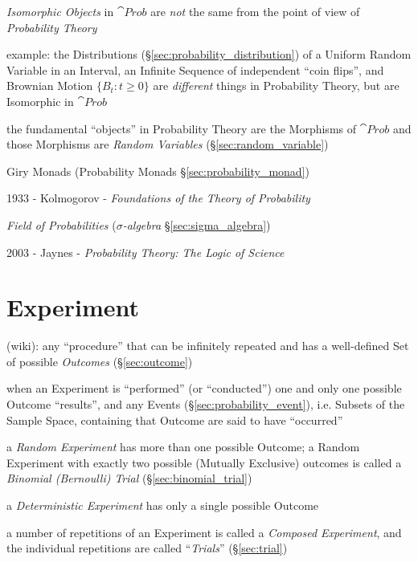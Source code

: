 \emph{Isomorphic Objects} in $\cat{Prob}$ are \emph{not} the same from the point
of view of \emph{Probability Theory}

example: the Distributions (\S\ref{sec:probability_distribution}) of a Uniform
Random Variable in an Interval, an Infinite Sequence of independent ``coin
flips'', and Brownian Motion $\{B_t : t \geq 0\}$ are \emph{different} things in
Probability Theory, but are Isomorphic in $\cat{Prob}$

the fundamental ``objects'' in Probability Theory are the Morphisms of
$\cat{Prob}$ and those Morphisms are \emph{Random Variables}
(\S\ref{sec:random_variable})

\fist Giry Monads (Probability Monads \S\ref{sec:probability_monad})

\asterism

1933 - Kolmogorov - \emph{Foundations of the Theory of Probability}

\emph{Field of Probabilities} (\emph{$\sigma$-algebra}
\S\ref{sec:sigma_algebra})

\asterism

2003 - Jaynes - \emph{Probability Theory: The Logic of Science}



\section{Experiment}\label{sec:experiment}

(wiki): any ``procedure'' that can be infinitely repeated and has a well-defined
Set of possible \emph{Outcomes} (\S\ref{sec:outcome})

when an Experiment is ``performed'' (or ``conducted'') one and only one possible
Outcome ``results'', and any Events (\S\ref{sec:probability_event}), i.e.
Subsets of the Sample Space, containing that Outcome are said to have
``occurred''

a \emph{Random Experiment} has more than one possible Outcome; a Random
Experiment with exactly two possible (Mutually Exclusive) outcomes is called a
\emph{Binomial (Bernoulli) Trial} (\S\ref{sec:binomial_trial})

a \emph{Deterministic Experiment} has only a single possible Outcome

a number of repetitions of an Experiment is called a \emph{Composed Experiment},
and the individual repetitions are called ``\emph{Trials}'' (\S\ref{sec:trial})

